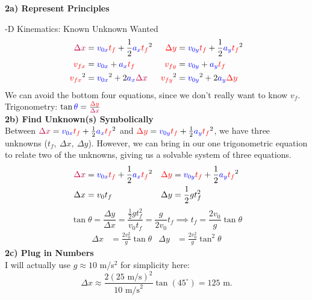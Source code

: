 \documentclass[]{article}
\begin{document}
\begin{TeacherMargin}
	\noindent\textbf{2a) Represent Principles}
	
	-D Kinematics: {\color{blue}Known} {\color{red}Unknown} {\color{purple}Wanted}
	\begin{align*}
		{\color{purple}\Delta x} & = {\color{blue}v_{0x}}{\color{red}t_{f}} + \frac{1}{2}{\color{blue}a_{x}}{\color{red}t_{f}}^{2} & {\color{red}\Delta y} & = {\color{blue}v_{0y}}{\color{red}t_{f}} + \frac{1}{2}{\color{blue}a_{y}}{\color{red}t_{f}}^{2} \\
		{\color{red}v_{fx}} & = {\color{blue}v_{0x}} + {\color{blue}a_{x}}{\color{red}t_{f}} & {\color{red}v_{fy}} & = {\color{blue}v_{0y}}+{\color{blue}a_{y}}{\color{red}t_{f}} \\
		{\color{red}v_{fx}}^{2} & = {\color{blue}v_{0x}}^{2} + 2{\color{blue}a_{x}}{\color{purple}\Delta x} & {\color{red}v_{fy}}^{2} & = {\color{blue}v_{0y}}^{2} + 2{\color{blue}a_{y}}{\color{red}\Delta y}
	\end{align*}
	We can avoid the bottom four equations, since we don't really want to know $v_{f}$. \\
	Trigonometry: $\tan{\color{blue}\theta} = \frac{\color{red}\Delta y}{\color{purple}\Delta x}$ \\
	\textbf{2b) Find Unknown(s) Symbolically} \\
	Between ${\color{purple}\Delta x} = {\color{blue}v_{0x}}{\color{red}t_{f}} + \frac{1}{2}{\color{blue}a_{x}}{\color{red}t_{f}}^{2}$ and ${\color{red}\Delta y} = {\color{blue}v_{0y}}{\color{red}t_{f}} + \frac{1}{2}{\color{blue}a_{y}}{\color{red}t_{f}}^{2}$, we have three unknowns ($t_{f},\ \Delta x,\ \Delta y$). However, we can bring in our one trigonometric equation to relate two of the unknowns, giving us a solvable system of three equations.
	\begin{align*}
		{\color{purple}\Delta x} & = {\color{blue}v_{0x}}{\color{red}t_{f}} + \frac{1}{2}{\color{blue}a_{x}}{\color{red}t_{f}}^{2} & {\color{red}\Delta y} & = {\color{blue}v_{0y}}{\color{red}t_{f}} + \frac{1}{2}{\color{blue}a_{y}}{\color{red}t_{f}}^{2} \\
		\Delta x & = v_{0}t_{f} & \Delta y & = \frac{1}{2}gt_{f}^{2}
	\end{align*}
	\[
	\tan\theta = \frac{\Delta y}{\Delta x} = \frac{\frac{1}{2}gt_{f}^{2}}{v_{0}t_{f}} = \frac{g}{2v_{0}}t_{f} \implies t_{f} = \frac{2v_{0}}{g}\tan\theta
	\]
	\begin{align*}
	\Delta x & = \frac{2v_{0}^{2}}{g}\tan\theta & \Delta y & = \frac{2v_{0}^{2}}{g}\tan^{2}\theta
	\end{align*}
	\textbf{2c) Plug in Numbers} \\
	I will actually use $g\approx10$ m/s$^{2}$ for simplicity here:
	\[
	\Delta x \approx \frac{2(25\text{ m/s})^{2}}{10\text{ m/s}^{2}}\tan(45^{\circ}) = 125\text{ m}.
	\]
\end{TeacherMargin}
\end{document}
